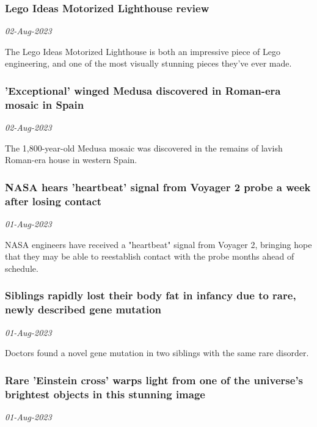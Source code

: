 \subsubsection{Lego Ideas Motorized Lighthouse review \href{https://www.livescience.com/human-behavior/arts-entertainment/lego-ideas-motorized-lighthouse-review-21335}{}}
\textit{02-Aug-2023}

The Lego Ideas Motorized Lighthouse is both an impressive piece of Lego engineering, and one of the most visually stunning pieces they've ever made.
\subsubsection{'Exceptional' winged Medusa discovered in Roman-era mosaic in Spain \href{https://www.livescience.com/archaeology/romans/exceptional-winged-medusa-discovered-in-roman-era-mosaic-in-spain}{}}
\textit{02-Aug-2023}

The 1,800-year-old Medusa mosaic was discovered in the remains of lavish Roman-era house in western Spain.
\subsubsection{NASA hears 'heartbeat' signal from Voyager 2 probe a week after losing contact \href{https://www.livescience.com/space/space-exploration/nasa-hears-heartbeat-signal-from-voyager-2-probe-a-week-after-losing-contact}{}}
\textit{01-Aug-2023}

NASA engineers have received a "heartbeat" signal from Voyager 2, bringing hope that they may be able to reestablish contact with the probe months ahead of schedule.
\subsubsection{Siblings rapidly lost their body fat in infancy due to rare, newly described gene mutation \href{https://www.livescience.com/health/genetics/siblings-rapidly-lost-their-body-fat-in-infancy-due-to-rare-newly-described-gene-mutation}{}}
\textit{01-Aug-2023}

Doctors found a novel gene mutation in two siblings with the same rare disorder.
\subsubsection{Rare 'Einstein cross' warps light from one of the universe's brightest objects in this stunning image \href{https://www.livescience.com/physics-mathematics/gravity/rare-einstein-cross-warps-light-from-one-of-the-universes-brightest-objects-in-this-stunning-image}{}}
\textit{01-Aug-2023}

